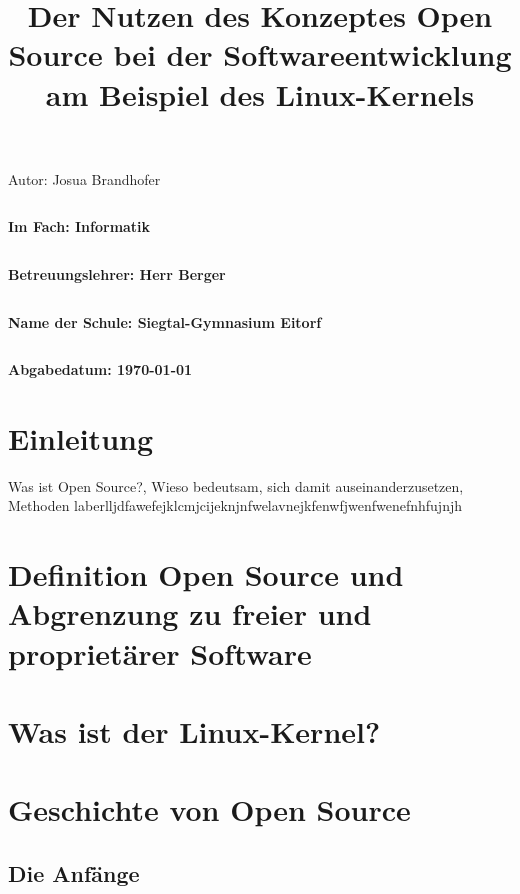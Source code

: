 \documentclass[a4paper,12pt]{article}
\title{Der Nutzen des Konzeptes Open Source bei der Softwareentwicklung am Beispiel des Linux-Kernels}
\date{}
\begin{document}
\maketitle
\thispagestyle{empty}
\begin{center}
  \LARGE Autor:    Josua Brandhofer
\end{center}
\begin{verbatim}
\end{verbatim}
\begin{center}
  \large\textbf{Im Fach:    Informatik}
\end{center}
\begin{verbatim}
\end{verbatim}
\begin{center}
  \large\textbf{Betreuungslehrer:    Herr Berger}
\end{center}
\begin{verbatim}
\end{verbatim}
\begin{center}
  \large\textbf{Name der Schule:    Siegtal-Gymnasium Eitorf}
\end{center}
\begin{verbatim}
\end{verbatim}
\begin{center}
  \large\textbf{Abgabedatum:    \today}
\end{center}

\newpage
{}
\tableofcontents
\newpage
\section{Einleitung}
Was ist Open Source?, Wieso bedeutsam, sich damit auseinanderzusetzen, Methoden laberlljdfawefejklcmjcijeknjnfwelavnejkfenwfjwenfwenefnhfujnjh
\section{Definition Open Source und Abgrenzung zu freier und proprietärer Software}
\section{Was ist der Linux-Kernel?}
\section{Geschichte von Open Source}
\subsection{Die Anfänge}
\end{document}
